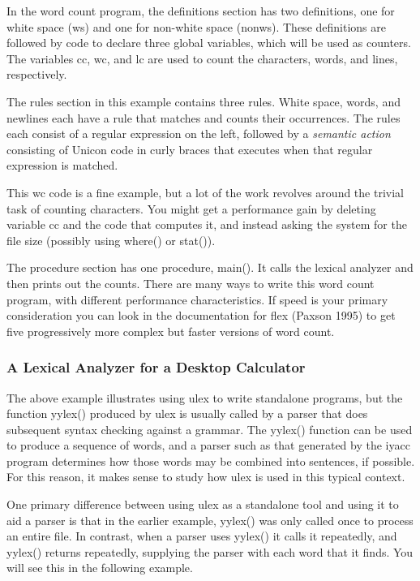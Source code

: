 In the word count program, the definitions section has two definitions,
one for white space (\textsf{ws}) and one for non-white space
(\textsf{nonws}). These definitions are followed by code to declare
three global variables, which will be used as counters. The variables
\textsf{cc}, \textsf{wc}, and \textsf{lc} are used to count the
characters, words, and lines, respectively.

The rules section in this example contains three rules. White space,
words, and newlines each have a rule that matches and counts their
occurrences. The rules each consist of a regular expression on the
left, followed by a {\em semantic action\/} consisting of Unicon code
in curly braces that executes when that regular expression is matched.

This \textsf{wc} code is a fine example, but a lot of the work
revolves around the trivial task of counting characters. You might
get a performance gain by deleting variable cc and the code that
computes it, and instead asking the system for the file size (possibly
using \textsf{where()} or \textsf{stat()}).

The procedure section has one procedure, \textsf{main()}. It calls the
lexical analyzer and then prints out the counts. There are many ways to
write this word count program, with different performance
characteristics. If speed is your primary consideration you can look in
the documentation for \textsf{flex} (Paxson 1995) to get five
progressively more complex but faster versions of word count.

\subsubsection{A Lexical Analyzer for a Desktop Calculator}

The above example illustrates using \textsf{ulex} to write standalone
programs, but the function \textsf{yylex()} produced by \textsf{ulex}
is usually called by a parser that does subsequent syntax checking
against a grammar. The \textsf{yylex()} function
can be used to produce a sequence of words, and a parser such as that
generated by the \textsf{iyacc} program determines how those words may
be combined into sentences, if possible. For this reason, it makes
sense to study how \textsf{ulex} is used in this typical context.

One primary difference between using ulex as a standalone tool and
using it to aid a parser is that in the earlier example,
\textsf{yylex()} was only called once to process an entire file. In
contrast, when a parser uses \textsf{yylex()} it calls it repeatedly,
and \textsf{yylex()} returns repeatedly, supplying the parser with each
word that it finds. You will see this in the following example.

